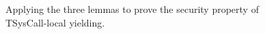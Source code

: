 \begin{figure}
\caption{\small Applying the three lemmas to prove the security
property of TSysCall-local yielding.}
\label{bigstep-sec}
\end{figure}
